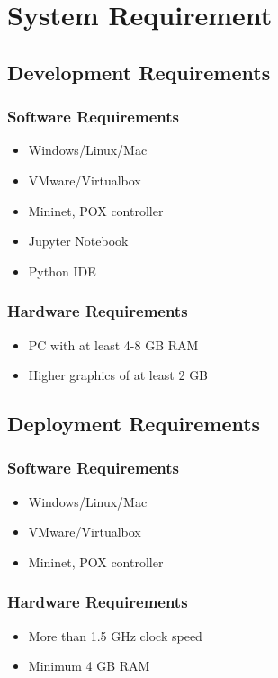 \section{System Requirement}
\vspace{-18pt}
\subsection{Development Requirements}
\vspace{-18pt}
\subsubsection{Software Requirements}
\vspace{-10pt}
\begin{itemize} 
\item Windows/Linux/Mac
\item VMware/Virtualbox
\item Mininet, POX controller
\item Jupyter Notebook
\item Python IDE
\end{itemize}
\subsubsection{Hardware Requirements}
\vspace{-10pt}
\begin{itemize}
\item PC with at least 4-8 GB RAM
\item  Higher graphics of at least 2 GB
\end{itemize}
\subsection{Deployment Requirements}
\vspace{-18pt}
\subsubsection{Software Requirements}
\vspace{-10pt}
\begin{itemize}
\item Windows/Linux/Mac
\item VMware/Virtualbox
\item Mininet, POX controller
\end{itemize}
\vspace{-10pt}
\subsubsection{Hardware Requirements}
\vspace{-10pt}
\begin{itemize}
\item More than 1.5 GHz clock speed
\item Minimum 4 GB RAM
\end{itemize}
\label{tblSampleTable}
